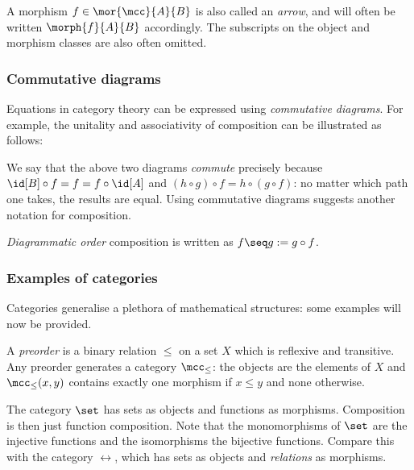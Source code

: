 A morphism \(f \in \mor{\mcc}{A}{B}\) is also called an \emph{arrow}, and will
often be written \(\morph{f}{A}{B}\) accordingly.
The subscripts on the object and morphism classes are also often omitted.

\subsubsection{Commutative diagrams}

Equations in category theory can be expressed using \emph{commutative diagrams}.
For example, the unitality and associativity of composition can be illustrated
as follows:

\begin{center}
    
    \quad
    
\end{center}

We say that the above two diagrams \emph{commute} precisely because \(
    \id[B] \circ f = f = f \circ \id[A]
\) and \((h \circ g) \circ f = h \circ (g \circ f)\): no matter which path one
takes, the results are equal.
Using commutative diagrams suggests another notation for composition.

\begin{notation}
    \emph{Diagrammatic order} composition is written as
    \(f \seq g := g \circ f\).
\end{notation}

\subsubsection{Examples of categories}

Categories generalise a plethora of mathematical structures: some examples will
now be provided.

\begin{example}[Preorder]
    A \emph{preorder} is a binary relation \(\leq\) on a set \(X\) which is
    reflexive and transitive.
    Any preorder generates a category \(\mcc_\leq\): the objects are the
    elements of \(X\) and \(\mcc_\leq(x, y)\) contains exactly one morphism if
    \(x \leq y\) and none otherwise.
\end{example}

\begin{example}[Sets]
    The category \(\set\) has sets as objects and functions as morphisms.
    Composition is then just function composition.
    Note that the monomorphisms of \(\set\) are the injective functions and the
    isomorphisms the bijective functions.
    Compare this with the category \(\rel\), which has sets as objects and
    \emph{relations} as morphisms.
\end{example}

